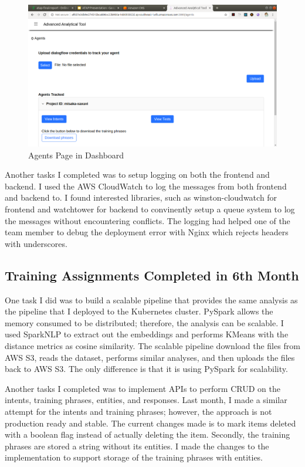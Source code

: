 \begin{figure}[h!]
	\begin{center}
		\includegraphics[width=450px]{assets/images/aat-agents.png}
		\caption{Agents Page in Dashboard}
		\label{fig:aat-agents}
	\end{center}
\end{figure}

\noindent
Another tasks I completed was to setup logging on both the frontend and backend. I used the AWS CloudWatch to log the messages from both frontend and backend to. I found interested libraries, such as winston-cloudwatch for frontend and watchtower for backend to convinently setup a queue system to log the messages without encountering conflicts. The logging had helped one of the team member to debug the deployment error with Nginx which rejects headers with underscores. 

\subsection{Training Assignments Completed in 6th Month}
\noindent
One task I did was to build a scalable pipeline that provides the same analysis as the pipeline that I deployed to the Kubernetes cluster. PySpark allows the memory consumed to be distributed; therefore, the analysis can be scalable. I used SparkNLP to extract out the embeddings and performs KMeans with the distance metrics as cosine similarity. The scalable pipeline download the files from AWS S3, reads the dataset, performs similar analyses, and then uploads the files back to AWS S3. The only difference is that it is using PySpark for scalability.

\noindent
Another tasks I completed was to implement APIs to perform CRUD on the intents, training phrases, entities, and responses. Last month, I made a similar attempt for the intents and training phrases; however, the approach is not production ready and stable. The current changes made is to mark items deleted with a boolean flag instead of actually deleting the item. Secondly, the training phrases are stored a string without its entities. I made the changes to the implementation to support storage of the training phrases with entities.